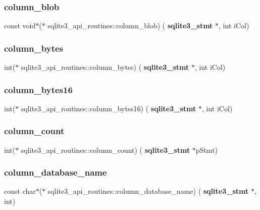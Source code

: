 \subsubsection{column\_blob}
{\footnotesize\ttfamily const void$\ast$($\ast$ sqlite3\+\_\+api\+\_\+routines\+::column\+\_\+blob) (\textbf{ sqlite3\+\_\+stmt} $\ast$, int i\+Col)}

\mbox{\label{structsqlite3__api__routines_a4925c38851818eebce76de641da69636}} 
\subsubsection{column\_bytes}
{\footnotesize\ttfamily int($\ast$ sqlite3\+\_\+api\+\_\+routines\+::column\+\_\+bytes) (\textbf{ sqlite3\+\_\+stmt} $\ast$, int i\+Col)}

\mbox{\label{structsqlite3__api__routines_a7355fc82d2138b79b2e188fd2de4d269}} 
\subsubsection{column\_bytes16}
{\footnotesize\ttfamily int($\ast$ sqlite3\+\_\+api\+\_\+routines\+::column\+\_\+bytes16) (\textbf{ sqlite3\+\_\+stmt} $\ast$, int i\+Col)}

\mbox{\label{structsqlite3__api__routines_a3a41d82a8b13513a505889c8c9b1c97e}} 
\subsubsection{column\_count}
{\footnotesize\ttfamily int($\ast$ sqlite3\+\_\+api\+\_\+routines\+::column\+\_\+count) (\textbf{ sqlite3\+\_\+stmt} $\ast$p\+Stmt)}

\mbox{\label{structsqlite3__api__routines_acd92d7b8700122a8c352d9f03c8fad37}} 
\subsubsection{column\_database\_name}
{\footnotesize\ttfamily const char$\ast$($\ast$ sqlite3\+\_\+api\+\_\+routines\+::column\+\_\+database\+\_\+name) (\textbf{ sqlite3\+\_\+stmt} $\ast$, int)}

